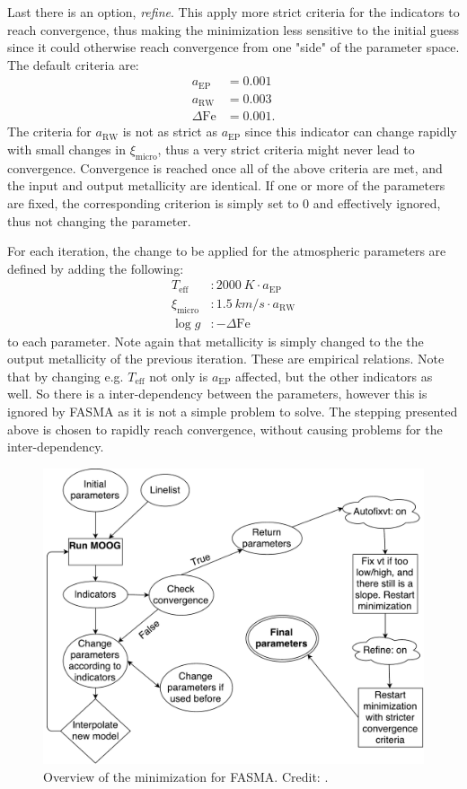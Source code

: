 Last there is an option, \emph{refine}. This apply more strict criteria for the
indicators to reach convergence, thus making the minimization less sensitive to
the initial guess since it could otherwise reach convergence from one "side" of
the parameter space. The default criteria are:
\begin{align*}
  a_\mathrm{EP}     &= 0.001\\
  a_\mathrm{RW}     &= 0.003\\
  \Delta\mathrm{Fe} &= 0.001.
\end{align*}
The criteria for $a_\mathrm{RW}$ is not as strict as $a_\mathrm{EP}$ since this
indicator can change rapidly with small changes in $\xi_\mathrm{micro}$, thus a
very strict criteria might never lead to convergence. Convergence is reached
once all of the above criteria are met, and the input and output metallicity are
identical. If one or more of the parameters are fixed, the corresponding
criterion is simply set to 0 and effectively ignored, thus not changing the
parameter.

For each iteration, the change to be applied for the atmospheric parameters are
defined by adding the following:
\begin{align}
  T_\mathrm{eff}     &: \SI{2000}{K} \cdot a_\mathrm{EP}   \\
  \xi_\mathrm{micro} &: \SI{1.5}{km/s} \cdot a_\mathrm{RW} \\
  \log g             &: -\Delta\mathrm{Fe}
\end{align}
to each parameter. Note again that metallicity is simply changed to the the
output metallicity of the previous iteration. These are empirical relations.
Note that by changing e.g. $T_\mathrm{eff}$ not only is $a_\mathrm{EP}$
affected, but the other indicators as well. So there is a inter-dependency
between the parameters, however this is ignored by FASMA as it is not a simple
problem to solve. The stepping presented above is chosen to rapidly reach
convergence, without causing problems for the inter-dependency.

\begin{figure}[htpb!]
    \centering
    \includegraphics[width=1.0\linewidth]{figures/FASMA_minimization.pdf}
    \caption{Overview of the minimization for FASMA. Credit: \citet{Andreasen2017a}.}
    \label{fig:minimization}
\end{figure}
